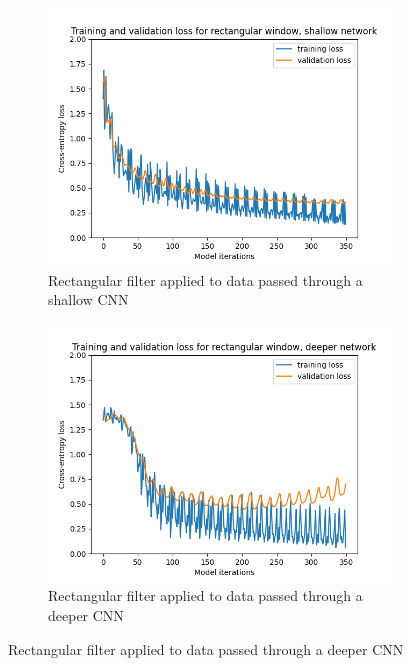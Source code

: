 \documentclass[class=report,11pt,crop=false]{standalone}
\begin{document}
\begin{figure}[hbt!]
    \begin{subfigure}[b]{0.5\textwidth}
        \includegraphics[width=\linewidth]{Images/rectangularSimple.png}
        \caption{Rectangular filter applied to data passed through a shallow CNN}
        \label{fig:RectShallow}
    \end{subfigure}
    \hfill
    \begin{subfigure}[b]{0.5\textwidth}
        \includegraphics[width=\linewidth]{Images/rectangularComplex.png}
        \caption{Rectangular filter applied to data passed through a deeper CNN}
        \label{fig:RectDeeper}
    \end{subfigure}
    \hfill

\end{figure}
\end{document}
